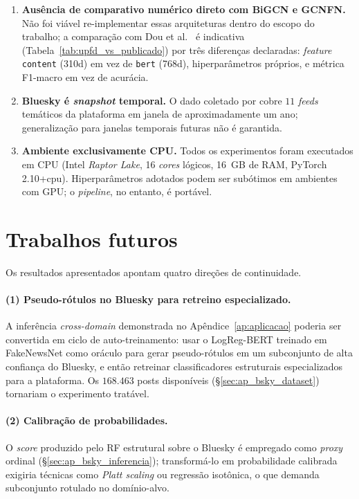\begin{enumerate}[label=(\alph*)]
\item \textbf{Aus\^encia de comparativo num\'erico direto com BiGCN e
GCNFN.} N\~ao foi vi\'avel re-implementar essas arquiteturas dentro do
escopo do trabalho; a compara\c{c}\~ao com Dou et al.~\cite{dou2021upfd}
\'e indicativa (Tabela~\ref{tab:upfd_vs_publicado}) por tr\^es
diferen\c{c}as declaradas: \emph{feature} \texttt{content} (310d) em
vez de \texttt{bert} (768d), hiperpar\^ametros pr\'oprios, e m\'etrica
F1-macro em vez de acur\'acia.

\item \textbf{Bluesky \'e \emph{snapshot} temporal.} O dado coletado por
\cite{failla2024bluesky} cobre $11$ \emph{feeds} tem\'aticos da
plataforma em janela de aproximadamente um ano; generaliza\c{c}\~ao para
janelas temporais futuras n\~ao \'e garantida.

\item \textbf{Ambiente exclusivamente CPU.} Todos os experimentos foram
executados em CPU (Intel \emph{Raptor Lake}, 16 \emph{cores} l\'ogicos,
16~GB de RAM, PyTorch 2.10+cpu). Hiperpar\^ametros adotados podem ser
sub\'otimos em ambientes com GPU; o \emph{pipeline}, no entanto, \'e
port\'avel.
\end{enumerate}

\section{Trabalhos futuros}
\label{sec:futuros}

Os resultados apresentados apontam quatro dire\c{c}\~oes de continuidade.

\paragraph{(1) Pseudo-r\'otulos no Bluesky para retreino especializado.}
A infer\^encia \emph{cross-domain} demonstrada no
Ap\^endice~\ref{ap:aplicacao} poderia ser convertida em ciclo de
auto-treinamento: usar o LogReg-BERT treinado em FakeNewsNet como
or\'aculo para gerar pseudo-r\'otulos em um subconjunto de alta
confian\c{c}a do Bluesky, e ent\~ao retreinar classificadores
estruturais especializados para a plataforma. Os $168.463$ posts
dispon\'iveis (\S\ref{sec:ap_bsky_dataset}) tornariam o experimento
trat\'avel.

\paragraph{(2) Calibra\c{c}\~ao de probabilidades.} O \emph{score}
produzido pelo RF estrutural sobre o Bluesky \'e empregado como
\emph{proxy} ordinal (\S\ref{sec:ap_bsky_inferencia}); transform\'a-lo em
probabilidade calibrada exigiria t\'ecnicas como \emph{Platt scaling}
ou regress\~ao isot\^onica, o que demanda subconjunto rotulado no
dom\'inio-alvo.

